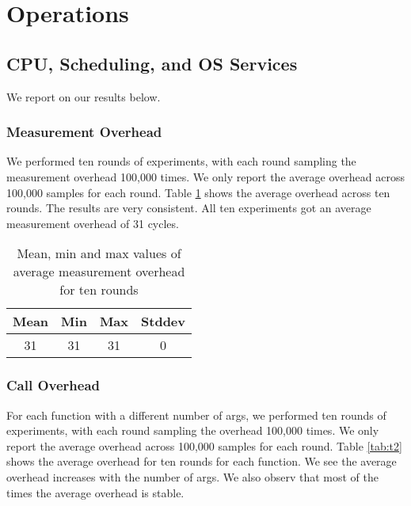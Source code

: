 \section{Operations}

\subsection{CPU, Scheduling, and OS Services}
We report on our results below.
\subsubsection{Measurement Overhead}
We performed ten rounds of experiments, with each round sampling the measurement overhead 100,000 times. We only report the average overhead across 100,000 samples for each round.
Table \ref{tab:t1} shows the average overhead across ten rounds. 
The results are very consistent.
All ten experiments got an average measurement overhead of 31 cycles.

\begin{table}[htb]

\caption{Mean, min and max values of average measurement overhead for ten rounds}

    \begin{tabular}{|c|c|c|c|} 
     \hline
     Mean & Min & Max & Stddev\\ 
     \hline
     31 & 31 & 31 & 0\\ 
     \hline
    \end{tabular}
    \label{tab:t1}
\end{table}

\subsubsection{Call Overhead}
For each function with a different number of args, we performed ten rounds of experiments, with each round sampling the overhead 100,000 times. We only report the average overhead across 100,000 samples for each round.
Table \ref{tab:t2} shows the average overhead for ten rounds for each function. 
We see the average overhead increases with the number of args. 
We also observ that most of the times the average overhead is stable.

